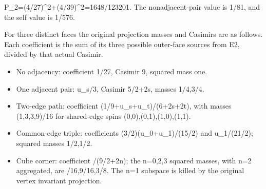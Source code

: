 \documentclass[11pt,a4paper]{article}
\providecommand{\tightlist}{\setlength{\itemsep}{0pt}\setlength{\parskip}{0pt}}
\renewcommand{\[}{\begingroup\small\originaldisplaystart}
\renewcommand{\]}{\originaldisplayend\endgroup}
\begin{document}
\[
 P_2=(4/27)^2+(4/39)^2=1648/123201.
\] The nonadjacent-pair value is 1/81, and the self value is 1/576.

For three distinct faces the original projection masses and Casimirs are
as follows. Each coefficient is the sum of its three possible outer-face
sources from E2, divided by that actual Casimir.

\begin{itemize}
\tightlist
\item
  No adjacency: coefficient 1/27, Casimir 9, squared mass one.
\item
  One adjacent pair:
  {\ttfamily u\allowbreak{}\_\allowbreak{}s\allowbreak{}/\allowbreak{}3\allowbreak{}},
  Casimir
  {\allowbreak{}5\allowbreak{}/\allowbreak{}2\allowbreak{}+\allowbreak{}2\allowbreak{}s\allowbreak{}},
  masses 1/4,3/4.
\item
  Two-edge path: coefficient
  {\ttfamily (\allowbreak{}1\allowbreak{}/\allowbreak{}9\allowbreak{}+\allowbreak{}u\allowbreak{}\_\allowbreak{}s\allowbreak{}+\allowbreak{}u\allowbreak{}\_\allowbreak{}t\allowbreak{})\allowbreak{}/\allowbreak{}(\allowbreak{}6\allowbreak{}+\allowbreak{}2\allowbreak{}s\allowbreak{}+\allowbreak{}2\allowbreak{}t\allowbreak{})\allowbreak{}},
  with masses
  {\ttfamily (\allowbreak{}1\allowbreak{},\allowbreak{}3\allowbreak{},\allowbreak{}3\allowbreak{},\allowbreak{}9\allowbreak{})\allowbreak{}/\allowbreak{}1\allowbreak{}6\allowbreak{}}
  for shared-edge spins
  {\ttfamily (\allowbreak{}0\allowbreak{},\allowbreak{}0\allowbreak{})\allowbreak{},\allowbreak{}(\allowbreak{}0\allowbreak{},\allowbreak{}1\allowbreak{})\allowbreak{},\allowbreak{}(\allowbreak{}1\allowbreak{},\allowbreak{}0\allowbreak{})\allowbreak{},\allowbreak{}(\allowbreak{}1\allowbreak{},\allowbreak{}1\allowbreak{})\allowbreak{}}.
\item
  Common-edge triple: coefficients
  {\ttfamily (\allowbreak{}3\allowbreak{}/\allowbreak{}2\allowbreak{})\allowbreak{}(\allowbreak{}u\allowbreak{}\_\allowbreak{}0\allowbreak{}+\allowbreak{}u\allowbreak{}\_\allowbreak{}1\allowbreak{})\allowbreak{}/\allowbreak{}(\allowbreak{}1\allowbreak{}5\allowbreak{}/\allowbreak{}2\allowbreak{})\allowbreak{}}
  and
  {\allowbreak{}u\allowbreak{}\_\allowbreak{}1\allowbreak{}/\allowbreak{}(\allowbreak{}2\allowbreak{}1\allowbreak{}/\allowbreak{}2\allowbreak{})\allowbreak{}};
  squared masses 1/2,1/2.
\item
  Cube corner: coefficient
  {\allowbreak{}/\allowbreak{}(\allowbreak{}9\allowbreak{}/\allowbreak{}2\allowbreak{}+\allowbreak{}2\allowbreak{}n\allowbreak{})\allowbreak{}};
  the n=0,2,3 squared masses, with n=2 aggregated, are
  {\allowbreak{}/\allowbreak{}1\allowbreak{}6\allowbreak{},\allowbreak{}9\allowbreak{}/\allowbreak{}1\allowbreak{}6\allowbreak{},\allowbreak{}3\allowbreak{}/\allowbreak{}8\allowbreak{}}.
  The n=1 subspace is killed by the original vertex invariant
  projection.
\end{itemize}
\end{document}

